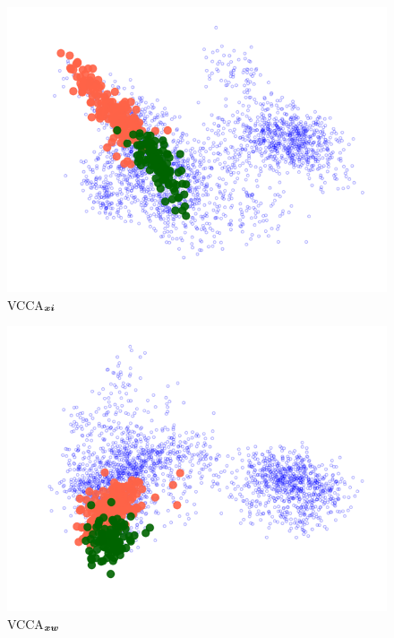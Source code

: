 \begin{subfigure}[b]{0.3\textwidth}
	\centering
	\includegraphics[width=\textwidth]{Chapter1/pics_paperB/pca_latents_apples_vcca_xi_seed2}
	\vspace{-8mm}
	\caption{VCCA$_{{\bm{x}}{\bm{i}}}$}
	\label{fig:pca_latents_vcca_xi_apples}
\end{subfigure}
\hfill
\begin{subfigure}[b]{0.3\textwidth}
	\centering
	\includegraphics[width=\textwidth]{Chapter1/pics_paperB/pca_latents_apples_vcca_xw_seed2}
	\vspace{-8mm}
	\caption{VCCA$_{{\bm{x}}{\bm{w}}}$}
\label{fig:pca_latents_vcca_xw_apples}
\end{subfigure} \\
